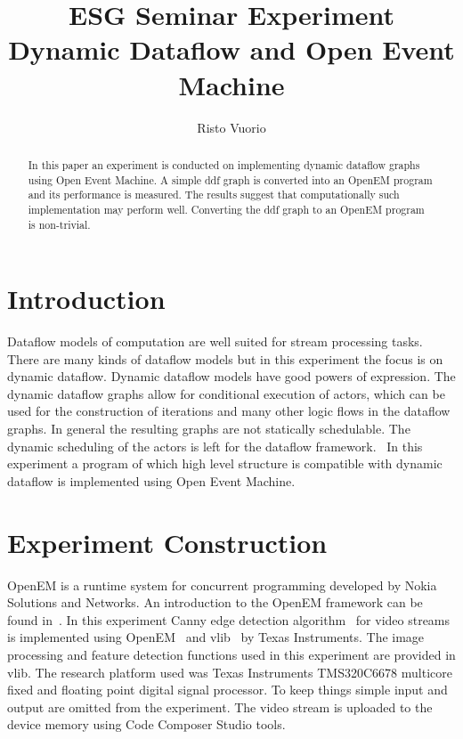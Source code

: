 \documentclass[a4paper,10pt]{article}
\begin{document}
%
\title{ESG Seminar Experiment \\ Dynamic Dataflow and Open Event Machine}

\author{Risto Vuorio}

\maketitle

\begin{abstract}
In this paper an experiment is conducted on implementing dynamic dataflow graphs using Open Event Machine. A simple ddf graph is converted into an OpenEM program and its performance is measured. The results suggest that computationally such implementation may perform well. Converting the ddf graph to an OpenEM program is non-trivial.
\end{abstract}

\section{Introduction}
Dataflow models of computation are well suited for stream processing tasks. There are many kinds of dataflow models but in this experiment the focus is on dynamic dataflow. Dynamic dataflow models have good powers of expression. The dynamic dataflow graphs allow for conditional execution of actors, which can be used for the construction of iterations and many other logic flows in the dataflow graphs. In general the resulting graphs are not statically schedulable. The dynamic scheduling of the actors is left for the dataflow framework.~\cite{risto-semma} In this experiment a program of which high level structure is compatible with dynamic dataflow is implemented using Open Event Machine.

\section{Experiment Construction}
OpenEM is a runtime system for concurrent programming developed by Nokia Solutions and Networks.  An introduction to the OpenEM framework can be found in~\cite{risto-dippa}. In this experiment Canny edge detection algorithm~\cite{canny1986computational} for video streams is implemented using OpenEM~\cite{openemwhite} and vlib~\cite{vlib} by Texas Instruments. The image processing and feature detection functions used in this experiment are provided in vlib. The research platform used was Texas Instruments TMS320C6678 multicore fixed and floating point digital signal processor. To keep things simple input and output are omitted from the experiment. The video stream is uploaded to the device memory using Code Composer Studio tools.
\end{document}
